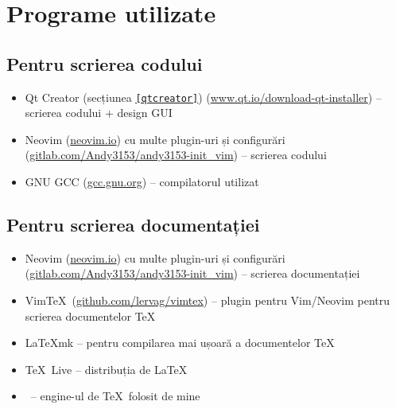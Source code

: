 \section{Programe utilizate}
\subsection{Pentru scrierea codului}
\begin{itemize}
 \item Qt Creator (secțiunea \underline{\texttt{\ref{qtcreator}}}) (\url{www.qt.io/download-qt-installer}) -- scrierea codului + design GUI
 \item Neovim (\url{neovim.io}) cu multe plugin-uri și configurări (\url{gitlab.com/Andy3153/andy3153-init_vim}) -- scrierea codului
 \item GNU GCC (\url{gcc.gnu.org}) -- compilatorul utilizat
\end{itemize}

\subsection{Pentru scrierea documentației}
\begin{itemize}
 \item Neovim (\url{neovim.io}) cu multe plugin-uri și configurări (\url{gitlab.com/Andy3153/andy3153-init_vim}) -- scrierea documentației
 \item Vim\TeX\ (\url{github.com/lervag/vimtex}) -- plugin pentru Vim/Neovim pentru scrierea documentelor \TeX
 \item \LaTeX mk -- pentru compilarea mai ușoară a documentelor \TeX
 \item \TeX\ Live -- distribuția de \LaTeX
 \item \XeLaTeX\ -- engine-ul de \TeX\ folosit de mine
\end{itemize}
